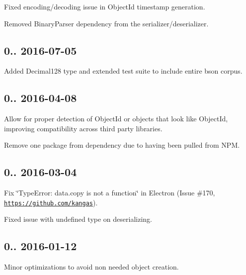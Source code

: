 \begin{DoxyItemize}
\item Fixed encoding/decoding issue in Object\+Id timestamp generation.
\item Removed Binary\+Parser dependency from the serializer/deserializer.
\end{DoxyItemize}

\subsection*{0.. 2016-\/07-\/05 }


\begin{DoxyItemize}
\item Added Decimal128 type and extended test suite to include entire bson corpus.
\end{DoxyItemize}

\subsection*{0.. 2016-\/04-\/08 }


\begin{DoxyItemize}
\item Allow for proper detection of Object\+Id or objects that look like Object\+Id, improving compatibility across third party libraries.
\item Remove one package from dependency due to having been pulled from N\+PM.
\end{DoxyItemize}

\subsection*{0.. 2016-\/03-\/04 }


\begin{DoxyItemize}
\item Fix \char`\"{}\+Type\+Error\+: data.\+copy is not a function\char`\"{} in Electron (Issue \#170, \href{https://github.com/kangas}{\tt https\+://github.\+com/kangas}).
\item Fixed issue with undefined type on deserializing.
\end{DoxyItemize}

\subsection*{0.. 2016-\/01-\/12 }


\begin{DoxyItemize}
\item Minor optimizations to avoid non needed object creation.
\end{DoxyItemize}


